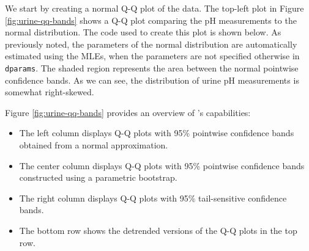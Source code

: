 We start by creating a normal Q-Q plot of the data. The top-left plot in
Figure \ref{fig:urine-qq-bands} shows a Q-Q plot comparing the pH
measurements to the normal distribution. The code used to create this
plot is shown below. As previously noted, the parameters of the normal
distribution are automatically estimated using the MLEs, when the
parameters are not specified otherwise in \texttt{dparams}. The shaded
region represents the area between the normal pointwise confidence
bands. As we can see, the distribution of urine pH measurements is
somewhat right-skewed.

\begin{Schunk}
\end{Schunk}

Figure \ref{fig:urine-qq-bands} provides an overview of 's
capabilities:

\begin{itemize}
\item
  The left column displays Q-Q plots with 95\% pointwise confidence
  bands obtained from a normal approximation.
\item
  The center column displays Q-Q plots with 95\% pointwise confidence
  bands constructed using a parametric bootstrap.
\item
  The right column displays Q-Q plots with 95\% tail-sensitive
  confidence bands.
\item
  The bottom row shows the detrended versions of the Q-Q plots in the
  top row.
\end{itemize}

